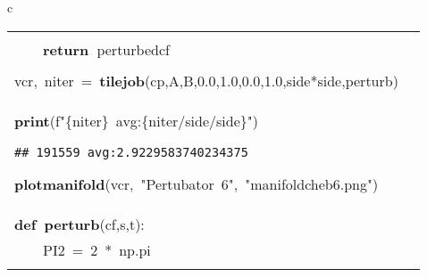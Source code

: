 \documentclass{article}\usepackage[]{graphicx}\usepackage[dvipsnames,table]{xcolor}
\makeatletter
\newcommand{\hlnum}[1]{\textcolor[rgb]{0.686,0.059,0.569}{#1}}%
\newcommand{\hlsng}[1]{\textcolor[rgb]{0.192,0.494,0.8}{#1}}%
\newcommand{\hlopt}[1]{\textcolor[rgb]{0,0,0}{#1}}%
\newcommand{\hldef}[1]{\textcolor[rgb]{0.345,0.345,0.345}{#1}}%
\newcommand{\hlkwa}[1]{\textcolor[rgb]{0.161,0.373,0.58}{\textbf{#1}}}%
\newcommand{\hlkwb}[1]{\textcolor[rgb]{0.69,0.353,0.396}{#1}}%
\newcommand{\hlkwd}[1]{\textcolor[rgb]{0.737,0.353,0.396}{\textbf{#1}}}%
\let\hlipl\hlkwb
\newenvironment{kframe}{%
 \def\at@end@of@kframe{}%
 \ifinner\ifhmode%
  \def\at@end@of@kframe{\end{minipage}}%
  \begin{minipage}{\columnwidth}%
 \fi\fi%
 \def\FrameCommand##1{\hskip\@totalleftmargin \hskip-\fboxsep
 \colorbox{shadecolor}{##1}\hskip-\fboxsep
     \hskip-\linewidth \hskip-\@totalleftmargin \hskip\columnwidth}%
 \MakeFramed {\advance\hsize-\width
   \@totalleftmargin\z@ \linewidth\hsize
   \@setminipage}}%
 {\par\unskip\endMakeFramed%
 \at@end@of@kframe}
\newenvironment{knitrout}{}{} %
\makeatother
\begin{document}
\begin{center}
\begin{tabular}{c}
\begin{tabular}{m{10cm}m{10cm}}
\begin{minipage}[m]{10cm}
\begin{knitrout}
\begin{kframe}
\hldef{}\hldef{\ \ \ \ }\hldef{perturbed\textunderscore cf}\hlopt{{[}}\hldef{}\hlnum{0}\hldef{}\hlopt{{]}\ {*}=\ (}\hldef{s}\hlopt{+}\hldef{t}\hlopt{)}\hspace*{\fill}\\
\hldef{}\hldef{\ \ \ \ }\hldef{}\hlkwa{return\ }\hldef{perturbed\textunderscore cf}\hspace*{\fill}\\
\hldef{}\hspace*{\fill}\\
\hldef{vcr}\hlopt{,\ }\hldef{niter\ }\hlopt{=\ }\hldef{}\hlkwd{tile\textunderscore job}\hldef{}\hlopt{(}\hldef{cp}\hlopt{,}\hldef{A}\hlopt{,}\hldef{B}\hlopt{,}\hldef{}\hlnum{0.0}\hldef{}\hlopt{,}\hldef{}\hlnum{1.0}\hldef{}\hlopt{,}\hldef{}\hlnum{0.0}\hldef{}\hlopt{,}\hldef{}\hlnum{1.0}\hldef{}\hlopt{,}\hldef{side}\hlopt{{*}}\hldef{side}\hlopt{,}\hldef{perturb\textunderscore 6}\hlopt{)}\hspace*{\fill}\\
\hldef{}\hlkwa{print}\hldef{}\hlopt{(}\hldef{f}\hlsng{"}\hlipl{\{niter\}\ }\hlsng{avg:}\hlipl{\{niter/side/side\}}\hlsng{"}\hldef{}\hlopt{)}\hldef{}\hspace*{\fill}
\mbox{}
\normalfont
\begin{verbatim}
## 191559 avg:2.9229583740234375
\end{verbatim}
\noindent
\ttfamily
\hldef{}\hlkwd{plot\textunderscore manifold}\hldef{}\hlopt{(}\hldef{vcr}\hlopt{,\ }\hldef{}\hlsng{"Pertubator\ 6"}\hldef{}\hlopt{,\ }\hldef{}\hlsng{"manifold\textunderscore cheb6.png"}\hldef{}\hlopt{)}\hldef{}\hspace*{\fill}
\mbox{}
\normalfont
\end{kframe}
\end{knitrout}
\end{minipage}
&
\begin{minipage}[m]{10cm}
\begin{knitrout}\tiny
\definecolor{shadecolor}{rgb}{0.969, 0.969, 0.969}\color{fgcolor}\begin{kframe}
\noindent
\ttfamily
\hldef{}\hlkwb{@njit}\hspace*{\fill}\\
\hldef{}\hlkwa{def\ }\hldef{}\hlkwd{perturb\textunderscore 7}\hldef{}\hlopt{(}\hldef{cf}\hlopt{,}\hldef{s}\hlopt{,}\hldef{t}\hlopt{):}\hspace*{\fill}\\
\hldef{}\hldef{\ \ \ \ }\hldef{PI2\ }\hlopt{=\ }\hldef{}\hlnum{2\ }\hldef{}\hlopt{{*}\ }\hldef{np}\hlopt{.}\hldef{pi}\hspace*{\fill}\\

\end{kframe}
\end{knitrout}
\end{minipage}
\end{tabular}
\end{tabular}
\end{center}
\end{document}
